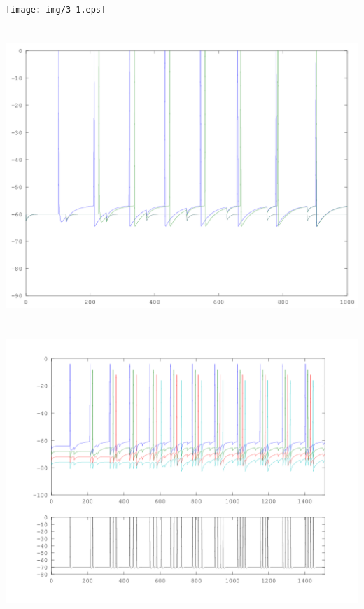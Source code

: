 \documentclass[12pt,a4paper]{article}
\begin{document}
\section{}%

\section{}%

\section{}%
\texttt{[image: img/3-1.eps]} \\
\begin{multicols}{2}
\section{}%
\includegraphics[keepaspectratio,width=.45\textwidth]{img/4.png} \\
\columnbreak
\section{}%
\includegraphics[keepaspectratio,width=.45\textwidth]{img/5.png} \\
\end{multicols}
\section{}%

\end{document}
